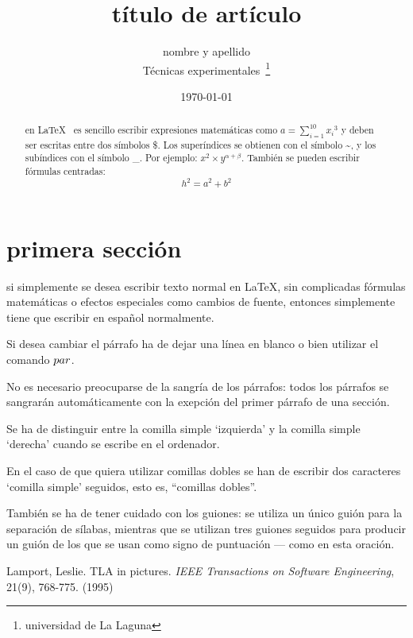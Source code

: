 \documentclass[a4paper, 12pt]{article}
\begin{document}
\title{título de artículo}
\author{nombre y apellido \\
      Técnicas experimentales~\footnote{universidad de La Laguna}
      }
\date{\today}
\maketitle
\begin{abstract}
   en \LaTeX{}~\cite{lam:86} es sencillo escribir expresiones
   matemáticas como $a=\sum_{i=1}^{10} {x_i}^{3}$
   y deben ser escritas entre dos símbolos \$.
   Los superíndices se obtienen con el símbolo \~{}, y
   los subíndices con el símbolo \_.
   Por ejemplo: $x^2 \times y^{\alpha + \beta}$.
   También se pueden escribir fórmulas centradas:
   \[h^2=a^2 + b^2 \]
\end{abstract}

\section{primera sección}
 si simplemente se desea escribir texto normal en LaTeX,
 sin complicadas f\'ormulas matem\'aticas o efectos especiales
 como cambios de fuente, entonces simplemente tiene que escribir
 en espa\~nol normalmente.\par
 Si desea cambiar el párrafo ha de dejar una línea en blanco o bien
 utilizar el comando $\\par$.
 
 No es necesario preocuparse de la sangría de los párrafos:
 todos los párrafos se sangrarán automáticamente con la exepción
 del primer párrafo de una sección.
 
 Se ha de distinguir entre la comilla simple `izquierda'
 y la comilla simple `derecha' cuando se escribe en el ordenador.
 
 En el caso de que quiera utilizar comillas dobles se han de 
 escribir dos caracteres `comilla simple'  seguidos, esto es,
 ``comillas dobles''.
 
 También se ha de tener cuidado con los guiones: se utiliza un único
 guión para la separación de sílabas, mientras que se utilizan
 tres guiones seguidos para producir un guión de los que se usan
 como signo de puntuación --- como en esta oración.
 \begin{thebibliography}{00}
     Lamport, Leslie.
     TLA in pictures.
     \emph{IEEE Transactions on Software Engineering},
     21(9), 768-775.
     (1995)
  \end{thebibliography}
 
\end{document}
